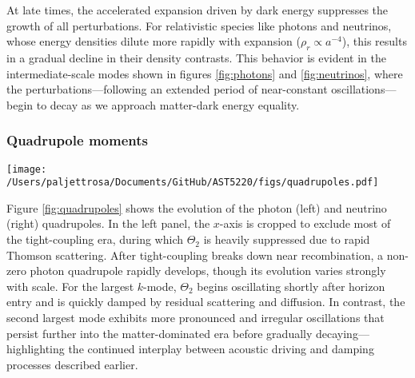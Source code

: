 \documentclass{aa}
\numberwithin{equation}{section}
\numberwithin{table}{section}
\numberwithin{figure}{section}
\begin{document}
At late times, the accelerated expansion driven by dark energy suppresses the growth of all perturbations. For relativistic species like photons and neutrinos, whose energy densities dilute more rapidly with expansion ($\rho_r \propto a^{-4}$), this results in a gradual decline in their density contrasts. This behavior is evident in the intermediate-scale modes shown in figures \ref{fig:photons} and \ref{fig:neutrinos}, where the perturbations—following an extended period of near-constant oscillations—begin to decay as we approach matter-dark energy equality.



\subsubsection{Quadrupole moments}\label{subsubsec: III results quadrupoles}

\begin{figure*}
  \centering
  \texttt{[image: /Users/paljettrosa/Documents/GitHub/AST5220/figs/quadrupoles.pdf]}
  \caption{Evolution of the photon quadrupole $\Theta_2$ (left) and the neutrino quadrupole $\mathcal{N}_2$ (right). 
  The photon quadrupole remains suppressed until tight-coupling breaks down, while the neutrino quadrupole freely grows after horizon crossing.}\label{fig:quadrupoles}
\end{figure*}

Figure \ref{fig:quadrupoles} shows the evolution of the photon (left) and neutrino (right) quadrupoles. In the left panel, the $x$-axis is cropped to exclude most of the tight-coupling era, during which $\Theta_2$ is heavily suppressed due to rapid Thomson scattering. After tight-coupling breaks down near recombination, a non-zero photon quadrupole rapidly develops, though its evolution varies strongly with scale. For the largest $k$-mode, $\Theta_2$ begins oscillating shortly after horizon entry and is quickly damped by residual scattering and diffusion. In contrast, the second largest mode exhibits more pronounced and irregular oscillations that persist further into the matter-dominated era before gradually decaying—highlighting the continued interplay between acoustic driving and damping processes described earlier.
\end{document}
